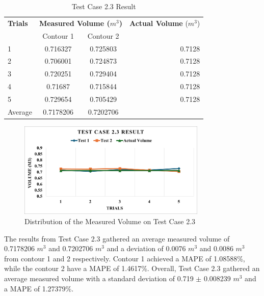 \begin{table}[H]
	\centering
	\caption{Test Case 2.3 Result}
	\label{table:test_case_2-3_results}
	\begin{tabular}{l c c r}
		\toprule
		\textbf{Trials} & \multicolumn{2}{c}{\textbf{Measured Volume ($m^{3}$)}} & \textbf{Actual Volume} ($m^{3}$)          \\
		{}              & Contour 1                                              & Contour 2                        & {}     \\ \midrule
		1               & 0.716327                                               & 0.725803                         & 0.7128 \\
		2               & 0.706001                                               & 0.724873                         & 0.7128 \\
		3               & 0.720251                                               & 0.729404                         & 0.7128 \\
		4               & 0.71687                                                & 0.715844                         & 0.7128 \\
		5               & 0.729654                                               & 0.705429                         & 0.7128 \\ \midrule
		Average         & 0.7178206                                              & 0.7202706                        & {}     \\ \bottomrule
	\end{tabular}
\end{table}

\begin{figure}[H]
	\centering
	\includegraphics[width=0.8\textwidth]{Figures/test-case-2-3-graph}
	\caption{Distribution of the Measured Volume on Test Case 2.3}
	\label{ch4:fig:test-case-2-3-graph}
\end{figure}


The results from Test Case 2.3 gathered an average measured volume of 0.7178206 $m^{3}$ and 0.7202706 $m^{3}$ and a deviation of 0.0076 $m^{3}$ and 0.0086 $m^{3}$ from contour 1 and 2 respectively. Contour 1 achieved a MAPE of 1.08588\%, while the contour 2 have a MAPE of 1.4617\%. Overall, Test Case 2.3 gathered an average measured volume with a standard deviation of 0.719 $\pm$ 0.008239 $m^{3}$ and a MAPE of 1.27379\%.

